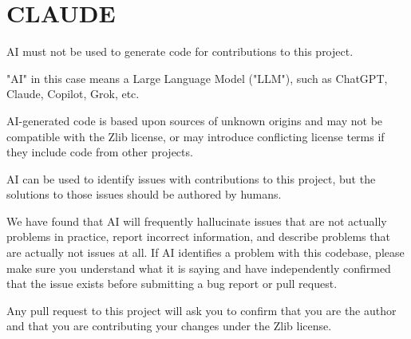 \chapter{CLAUDE }
\hypertarget{md__mono_runtime_2extern_2sdl_2_c_l_a_u_d_e}{}\label{md__mono_runtime_2extern_2sdl_2_c_l_a_u_d_e}
AI must not be used to generate code for contributions to this project.

"{}\+AI"{} in this case means a Large Language Model ("{}\+LLM"{}), such as Chat\+GPT, Claude, Copilot, Grok, etc.

AI-\/generated code is based upon sources of unknown origins and may not be compatible with the Zlib license, or may introduce conflicting license terms if they include code from other projects.

AI can be used to identify issues with contributions to this project, but the solutions to those issues should be authored by humans.

We have found that AI will frequently hallucinate issues that are not actually problems in practice, report incorrect information, and describe problems that are actually not issues at all. If AI identifies a problem with this codebase, please make sure you understand what it is saying and have independently confirmed that the issue exists before submitting a bug report or pull request.

Any pull request to this project will ask you to confirm that you are the author and that you are contributing your changes under the Zlib license. 